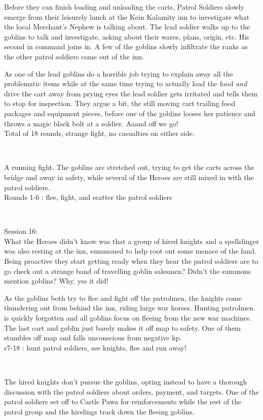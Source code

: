 Before they can finish loading and unloading the carts, Patrol Soldiers slowly emerge from their leisurely lunch at the Kein Kalamity inn to investigate what the local Merchant's Nephew is talking about. The lead soldier walks up to the goblins to talk and investigate, asking about their wares, plans, origin, etc. His second in command joins in. A few of the goblins slowly infiltrate the ranks as the other patrol soldiers come out of the inn.

As one of the lead goblins do a horrible job trying to explain away all the problematic items while at the same time trying to actually load the food \emph{and} drive the cart away from prying eyes the lead soldier gets irritated and tells them to stop for inspection. They argue a bit, the still moving cart trailing food packages and equipment pieces, before one of the goblins looses her patience and throws a magic black bolt at a soldier. Aaand off we go!\\
Total of 18 rounds, strange fight, no casualties on either side.

\

A running fight. The goblins are stretched out, trying to get the carts across the bridge and away in safety, while several of the Heroes are still mixed in with the patrol soldiers.\\
Rounds 1-6 : flee, fight, and scatter the patrol soldiers

\

Session 16:\\                                                           %
What the Heroes didn't know was that a group of hired knights and a spellslinger was also resting at the inn, summoned to help root out some menace of the land. Being proactive they start getting ready when they hear the patrol soldiers are to go check out a strange band of travelling goblin salesmen? Didn't the summons mention goblins? Why, yes it did!

As the goblins both try to flee and fight off the patrolmen, the knights come thundering out from behind the inn, riding large war horses. Hunting patrolmen is quickly forgotten and all goblins focus on fleeing from the new war machines. The last cart and goblin just barely makes it off map to safety. One of them stumbles off map and falls unconscious from negative hp.\\
r7-18 : hunt patrol soldiers, see knights, flee and run away!

\

The hired knights don't pursue the goblins, opting instead to have a thorough discussion with the patrol soldiers about orders, payment, and targets. One of the patrol soldiers set off to Castle Pawa for reinforcements while the rest of the patrol group and the hirelings track down the fleeing goblins.

